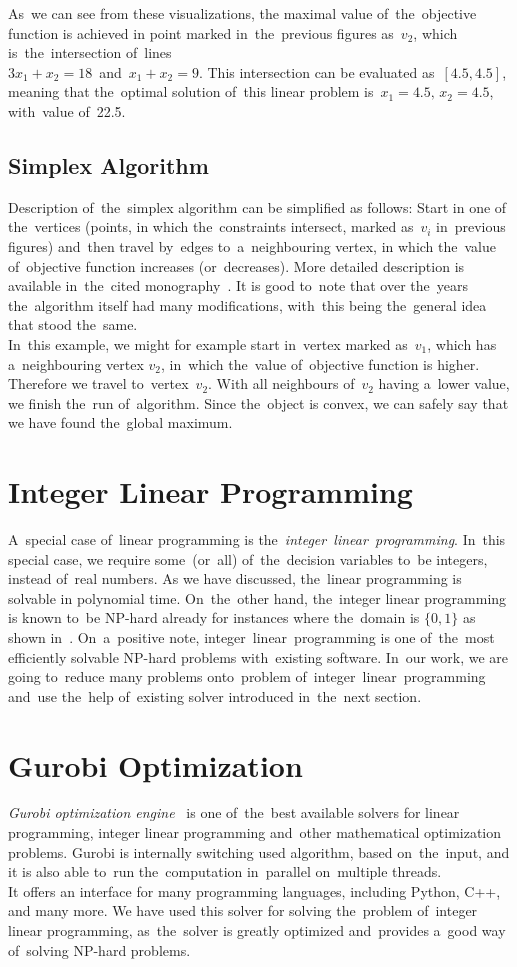 As~we can see from these visualizations, the maximal value of~the~objective function is achieved in point marked in~the~previous figures as~$v_2$, which is~the~intersection of~lines\\ ${3x_1 + x_2 = 18}$~and~${x_1 + x_2 = 9}$. This intersection can be evaluated as~$[4.5, 4.5]$, meaning that the~optimal solution of~this linear problem is~${x_1 = 4.5,\,x_2 = 4.5}$, with~value of~22.5.
\subsection{Simplex Algorithm}
\label{subsubsec:Simplex algorithm}
Description of~the~simplex algorithm can be simplified as follows: Start in one of the~vertices (points, in which the~constraints intersect, marked as~$v_i$ in~previous figures) and~then travel by~edges to~a~neighbouring vertex, in which the~value of~objective function increases (or~decreases). More detailed description is available in~the~cited monography~\cite{Sierksma}. It is good to~note that over the~years the~algorithm itself had many modifications, with~this being the~general idea that stood the~same.\\
In~this example, we might for example start in~vertex marked as~$v_1$, which has a~neighbouring vertex $v_2$, in~which the~value of~objective function is higher. Therefore we travel to~vertex~$v_2$. With all neighbours of~$v_2$ having a~lower value, we finish the~run of~algorithm. Since the~object is convex, we can safely say that we have found the~global maximum.
\section{Integer Linear Programming}
A~special case of~linear programming is the~\emph{integer~linear~programming}. In~this special case, we require some~(or~all) of~the~decision variables to~be integers, instead of~real numbers. As we have discussed, the~linear programming is solvable in polynomial time. On~the~other hand, the~integer linear programming is known to~be NP-hard already for instances where the~domain is $\{0, 1\}$ as shown in~\cite{Karp}.
On~a~positive note, integer~linear~programming is one of~the~most efficiently solvable NP-hard problems with~existing software. In~our work, we are going to~reduce many problems onto~problem of~integer~linear~programming and~use the~help of~existing solver introduced in~the~next section.
\section{Gurobi Optimization}
\textit{Gurobi optimization engine}~\cite{gurobi} is one of~the~best available solvers for linear programming, integer linear programming and~other mathematical optimization problems.
Gurobi is internally switching used algorithm, based on~the~input, and it is also able to~run the~computation in~parallel on~multiple threads.\\
It offers an interface for many programming languages, including Python, C++, and many more. We have used this solver for solving the~problem of~integer linear programming, as~the~solver is greatly optimized and~provides a~good way of~solving NP-hard problems.

